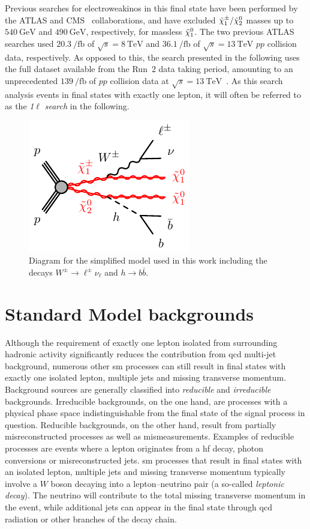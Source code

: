 Previous searches for electroweakinos in this final state have been performed by the \mbox{ATLAS} \cite{SUSY-2013-23,SUSY-2017-01} and CMS~\cite{CMS-SUS-16-043} collaborations, and have excluded $\tilde{\chi}_1^\pm/\tilde{\chi}_2^0$ masses up to $\SI{540}{\GeV}$ and $\SI{490}{\GeV}$, respectively, for massless $\tilde{\chi}_1^0$. The two previous ATLAS searches used $\SI{20.3}{\per\femto\barn}$ of $\sqrt{s}=\SI{8}{\TeV}$ and $\SI{36.1}{\per\femto\barn}$ of $\sqrt{s}=\SI{13}{\TeV}$ $pp$ collision data, respectively. As opposed to this, the search presented in the following uses the full dataset available from the Run~2 data taking period, amounting to an unprecedented $\SI{139}{\per\femto\barn}$ of $pp$ collision data at $\sqrt{s}=\SI{13}{\TeV}$~\cite{SUSY-2019-08}. As this search analysis events in final states with exactly one lepton, it will often be referred to as the \textit{1}$\ell$ \textit{search} in the following.

\begin{figure}
	\centering\includegraphics[width=.4\textwidth]{model_c1n2_Wh}
	\caption{Diagram for the simplified model used in this work including the decays $W^\pm\rightarrow\ell^\pm\nu_\ell$ and $h\rightarrow b\bar{b}$.}\label{fig:Wh_model_full}
\end{figure}

\section{Standard Model backgrounds}

Although the requirement of exactly one lepton isolated from surrounding hadronic activity significantly reduces the contribution from \gls{qcd} multi-jet background, numerous other \gls{sm} processes can still result in final states with exactly one isolated lepton, multiple jets and missing transverse momentum. Background sources are generally classified into \textit{reducible} and \textit{irreducible} backgrounds. Irreducible backgrounds, on the one hand, are processes with a physical phase space indistinguishable from the final state of the signal process in question. Reducible backgrounds, on the other hand, result from partially misreconstructed processes as well as mismeasurements. Examples of reducible processes are events where a lepton originates from a \gls{hf} decay, photon conversions or misreconstructed jets. \gls{sm} processes that result in final states with an isolated lepton, multiple jets and missing transverse momentum typically involve a $W$ boson decaying into a lepton--neutrino pair (a so-called \textit{leptonic decay}). The neutrino will contribute to the total missing transverse momentum in the event, while additional jets can appear in the final state through \gls{qcd} radiation or other branches of the decay chain.

